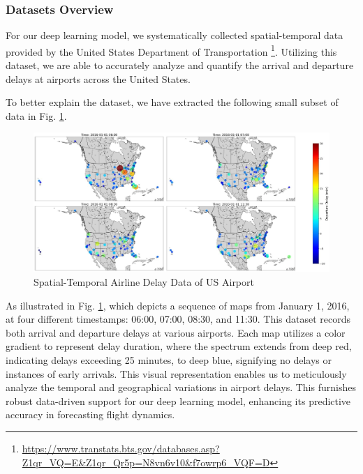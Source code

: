 \documentclass[conference]{IEEEtran}
\begin{document}
\subsubsection{Datasets Overview}
For our deep learning model, we systematically collected spatial-temporal data provided by the United States Department of Transportation \footnote{\url{https://www.transtats.bts.gov/databases.asp?Z1qr_VQ=E&Z1qr_Qr5p=N8vn6v10&f7owrp6_VQF=D}}. Utilizing this dataset, we are able to accurately analyze and quantify the arrival and departure delays at airports across the United States.

To better explain the dataset, we have extracted the following small subset of data in Fig. \ref{fig:Spatial-Temporal Data}.


\begin{figure}[h]
    \centering
    \includegraphics[width=0.85\linewidth]{Spatial-Temporal Airline Delay Data.png}
    \caption{Spatial-Temporal Airline Delay Data of US Airport}
    \label{fig:Spatial-Temporal Data}
\end{figure}

As illustrated in Fig. \ref{fig:Spatial-Temporal Data}, which depicts a sequence of maps from January 1, 2016, at four different timestamps: 06:00, 07:00, 08:30, and 11:30. This dataset records both arrival and departure delays at various airports. Each map utilizes a color gradient to represent delay duration, where the spectrum extends from deep red, indicating delays exceeding 25 minutes, to deep blue, signifying no delays or instances of early arrivals. This visual representation enables us to meticulously analyze the temporal and geographical variations in airport delays. This furnishes robust data-driven support for our deep learning model, enhancing its predictive accuracy in forecasting flight dynamics.
\end{document}
